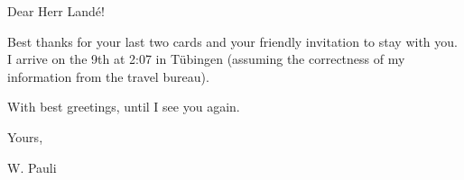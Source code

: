 \begin{letter}{80}
\begin{header}
\date{1925/01/05}

\makeheader

\end{header}

Dear Herr Land\'e!

Best thanks for your last two cards and your friendly invitation to stay with you. I arrive on the 9th at 2:07 in T\"ubingen (assuming the correctness of my information from the travel bureau).

With best greetings, until I see you again.

Yours,

W. Pauli

\end{letter}